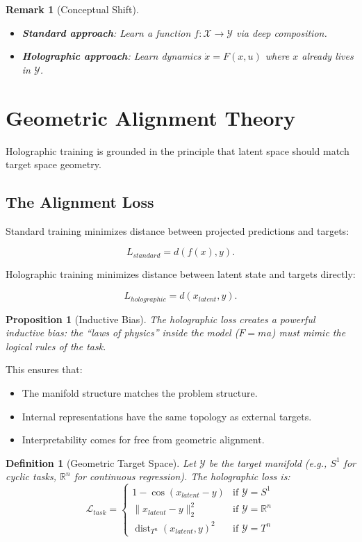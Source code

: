 \documentclass[12pt,letterpaper,twoside]{article}
\newtheorem{definition}{Definition}[section]
\newtheorem{remarque}{Remark}[section]
\newtheorem{prop}{Proposition}[section]
\begin{document}
\begin{remarque}[Conceptual Shift]
\begin{itemize}
\item \textbf{Standard approach}: Learn a function $f: \mathcal{X} \to \mathcal{Y}$ via deep composition.
\item \textbf{Holographic approach}: Learn dynamics $\dot{x} = F(x, u)$ where $x$ already lives in $\mathcal{Y}$.
\end{itemize}
\end{remarque}

\section{Geometric Alignment Theory}

Holographic training is grounded in the principle that latent space should match target space geometry.

\subsection{The Alignment Loss}

Standard training minimizes distance between projected predictions and targets:

\[
L_{standard} = d(f(x), y).
\]

Holographic training minimizes distance between latent state and targets directly:

\[
L_{holographic} = d(x_{latent}, y).
\]

\begin{prop}[Inductive Bias]
The holographic loss creates a powerful inductive bias: the ``laws of physics'' inside the model ($F=ma$) must mimic the logical rules of the task.
\end{prop}

This ensures that:
\begin{itemize}
\item The manifold structure matches the problem structure.
\item Internal representations have the same topology as external targets.
\item Interpretability comes for free from geometric alignment.
\end{itemize}

\begin{definition}[Geometric Target Space]
Let $\mathcal{Y}$ be the target manifold (e.g., $S^1$ for cyclic tasks, $\mathbb{R}^n$ for continuous regression). The holographic loss is:
\[
\mathcal{L}_{task} = 
\begin{cases}
1 - \cos(x_{latent} - y) & \text{if } \mathcal{Y} = S^1 \\
\|x_{latent} - y\|_2^2 & \text{if } \mathcal{Y} = \mathbb{R}^n \\
\operatorname{dist}_{T^n}(x_{latent}, y)^2 & \text{if } \mathcal{Y} = T^n
\end{cases}
\]
\end{definition}
\end{document}
